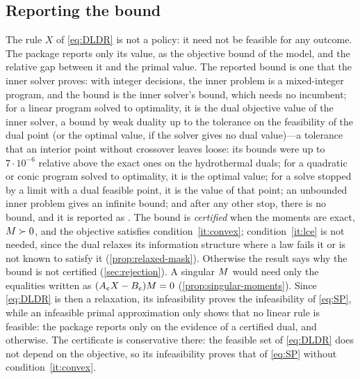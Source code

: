 \subsection{Reporting the bound}

The rule $X$ of \eqref{eq:DLDR} is not a policy: it need not be feasible for any outcome.
The package reports only its value, as the objective bound of the model, and the relative gap between it and the primal value.
The reported bound is one that the inner solver proves:
with integer decisions, the inner problem is a mixed-integer program, and the bound is the inner solver's bound, which needs no incumbent;
for a linear program solved to optimality, it is the dual objective value of the inner solver, a bound by weak duality up to the tolerance on the feasibility of the dual point (or the optimal value, if the solver gives no dual value)---a tolerance that an interior point without crossover leaves loose: its bounds were up to $7\cdot10^{-6}$ relative above the exact ones on the hydrothermal duals;
for a quadratic or conic program solved to optimality, it is the optimal value;
for a solve stopped by a limit with a dual feasible point, it is the value of that point;
an unbounded inner problem gives an infinite bound;
and after any other stop, there is no bound, and it is reported as .
The bound is \emph{certified} when the moments are exact, $M \succ 0$, and the objective satisfies condition~\ref{it:convex};
condition~\ref{it:lce} is not needed, since the dual relaxes its information structure where a law fails it or is not known to satisfy it (\cref{prop:relaxed-mask}).
Otherwise the result says why the bound is not certified (\cref{sec:rejection}).
A singular $M$ would need only the equalities written as $(A_eX - B_e)M = 0$ (\cref{prop:singular-moments}).
Since \eqref{eq:DLDR} is then a relaxation, its infeasibility proves the infeasibility of \eqref{eq:SP},
while an infeasible primal approximation only shows that no linear rule is feasible:
the package reports  only on the evidence of a certified dual, and  otherwise.
The certificate is conservative there: the feasible set of \eqref{eq:DLDR} does not depend on the objective, so its infeasibility proves that of \eqref{eq:SP} without condition~\ref{it:convex}.
